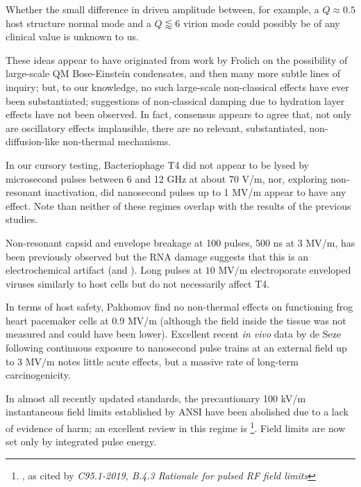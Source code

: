 \documentclass[paper.tex]{subfiles}
\begin{document}
Whether the small difference in driven amplitude between, for example, a $Q\approx0.5$ host structure normal mode and a $	Q\lessapprox6$ virion mode could possibly be of any clinical value is unknown to us. 

These ideas appear to have originated from work by Frolich on the possibility of large-scale QM Bose-Einstein condensates, and then many more subtle lines of inquiry\cite{Mechanisms1992}\cite{mechanisms1981}; but, to our knowledge, no such large-scale non-classical effects have ever been substantiated; suggestions of non-classical damping due to hydration layer effects have not been observed. In fact, consensus\cite{Exposure2009}\cite{ICNIRP2020}\cite{C95} appears to agree that, not only are oscillatory effects implausible, there are no relevant, substantiated, non-diffusion-like non-thermal mechanisms. 


In our cursory testing, Bacteriophage T4 did not appear to be lysed by microsecond pulses between 6 and 12 GHz at about 70 V/m, nor, exploring non-resonant inactivation, did nanosecond pulses up to 1 MV/m appear to have any effect. Note than neither of these regimes overlap with the results of the previous studies.

 Non-resonant capsid and envelope breakage at 100 pulses, 500 ns at 3 MV/m, has been previously observed\cite{Inactivation1990} but the RNA damage suggests that this is an electrochemical artifact \cite{Formation1996} (and \cite{Microwave1987}). Long pulses at $10$ MV/m electroporate enveloped viruses similarly to host cells\cite{AC2017} but do not necessarily affect T4\cite{Manipulation2013}. 

In terms of host safety, Pakhomov \cite{Comparative} find no non-thermal effects on functioning frog heart pacemaker cells at 0.9 MV/m (although the field inside the tissue was not measured and could have been lower). Excellent recent \textit{in vivo} data by de Seze following continuous exposure to nanosecond pulse trains at an external field up to 3 MV/m \cite{Repeated2020} notes little acute effects, but a massive rate of long-term carcinogenicity.

In almost all recently updated standards, the precautionary 100 kV/m instantaneous field limits established by ANSI have been abolished due to a lack of evidence of harm; an excellent review in this regime is \footnote{\cite{treatyelectromagnetic}, as cited by \textit{C95.1-2019, B.4.3 Rationale for pulsed RF field limits}}. Field limits are now set only by integrated pulse energy.
\end{document}
